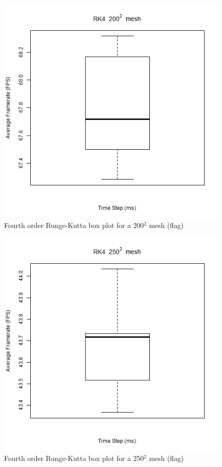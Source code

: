       \begin{figure}
    \begin{center}
      \includegraphics[scale=.9]{Figures/flag_rk4_200_box}
    \end{center}
    \caption{Fourth order Runge-Kutta box plot for a 200$^{2}$ mesh (flag)}
    \label{fig:rk4 box 200 flag}
  \end{figure}
  
      \begin{figure}
    \begin{center}
      \includegraphics[scale=.9]{Figures/flag_rk4_250_box}
    \end{center}
    \caption{Fourth order Runge-Kutta box plot for a 250$^{2}$ mesh (flag)}
    \label{fig:rk4 box 250 flag}
  \end{figure}
  

